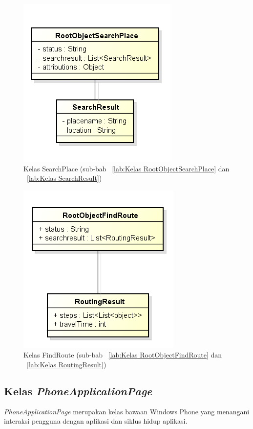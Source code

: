 \begin{figure}[h!]
	\centering
		\includegraphics[scale=0.7]{Gambar/useCase_dan_Class/perClass/SearchPlace}
	\caption{Kelas SearchPlace (sub-bab ~\ref{lab:Kelas RootObjectSearchPlace} dan ~\ref{lab:Kelas SearchResult})}
	\label{fig:kelaslSearchPlace}
\end{figure}

\begin{figure}[h!]
	\centering
		\includegraphics[scale=0.7]{Gambar/useCase_dan_Class/perClass/FindRoute}
	\caption{Kelas FindRoute (sub-bab ~\ref{lab:Kelas RootObjectFindRoute} dan ~\ref{lab:Kelas RoutingResult})}
	\label{fig:kelasFindRoute}
\end{figure}

\clearpage
\subsection{Kelas \textit{PhoneApplicationPage}}
\label{lab:Kelas PhoneApplicationPage}
\hspace{0.5cm} \textit{PhoneApplicationPage} merupakan kelas bawaan Windows Phone yang menangani interaksi pengguna dengan aplikasi dan siklus hidup aplikasi.

